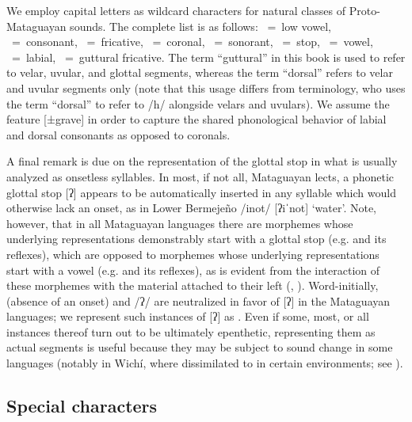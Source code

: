 We employ capital letters as wildcard characters for natural classes of Proto-Mataguayan sounds. The complete list is as follows: ~=~low vowel, ~=~consonant, ~=~fricative, ~=~coronal, ~=~sonorant, ~=~stop, ~=~vowel, ~=~labial, ~=~guttural fricative. The term ``guttural'' in this book is used to refer to velar, uvular, and glottal segments, whereas the term ``dorsal'' refers to velar and uvular segments only (note that this usage differs from  terminology, who uses the term ``dorsal'' to refer to /h/ alongside velars and uvulars). We assume the feature [±grave] in order to capture the shared phonological behavior of labial and dorsal consonants as opposed to coronals.

A final remark is due on the representation of the glottal stop in what is usually analyzed as onsetless syllables. In most, if not all, Mataguayan lects, a phonetic glottal stop [ʔ] appears to be automatically inserted in any syllable which would otherwise lack an onset, as in Lower Bermejeño /inot/ [ʔiˈnot] ‘water’. Note, however, that in all Mataguayan languages there are morphemes whose underlying representations demonstrably start with a glottal stop (e.g.  and its reflexes), which are opposed to morphemes whose underlying representations start with a vowel (e.g.  and its reflexes), as is evident from the interaction of these morphemes with the material attached to their left (, ). Word-initially,  (absence of an onset) and /ʔ/ are neutralized in favor of [ʔ] in the Mataguayan languages; we represent such instances of [ʔ] as . Even if some, most, or all instances thereof turn out to be ultimately epenthetic, representing them as actual segments is useful because they may be subject to sound change in some languages (notably in Wichí, where  dissimilated to  in certain environments; see ).

\subsection{Special characters}


